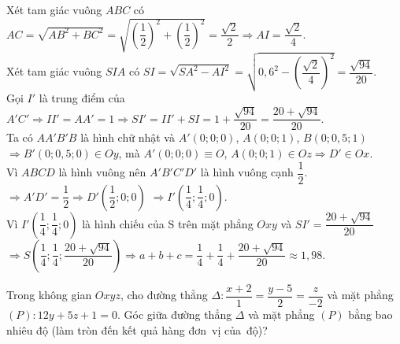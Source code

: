 \begin{bt}
{{		} 
		\noindent 
		Xét tam giác vuông  $ABC$ có $AC=\sqrt{AB^2+BC^2}=\sqrt{\left(\dfrac{1}{2}\right)^2+\left(\dfrac{1}{2}\right)^2}=\dfrac{\sqrt{2}}{2}\Rightarrow AI=\dfrac{\sqrt{2}}{4}$.\\
		Xét tam giác  vuông $SIA$ có $SI=\sqrt{SA^2-AI^2}=\sqrt{0{,}6^2-\left(\dfrac{\sqrt{2}}{4}\right)^2}=\dfrac{\sqrt{94}}{20}$.\\
		Gọi $I'$ là trung điểm của $A'C'\Rightarrow II'=AA'=1\Rightarrow  SI'=II'+SI=1+\dfrac{\sqrt{94}}{20}=\dfrac{20+\sqrt{94}}{20}$.\\
		Ta có $AA'B'B$ là hình chữ nhật  và $A'(0;0;0)$, $A(0;0;1)$, $B(0;0,5;1)$\\
		$\Rightarrow B'(0;0,5;0)\in Oy$, mà $A'(0;0;0)\equiv O$, $A(0;0;1)\in Oz\Rightarrow  D'\in Ox$.\\
		Vì $ABCD$ là hình vuông nên $A'B'C'D'$ là hình vuông  cạnh $\dfrac{1}{2}$.\\
		$\Rightarrow  A'D'=\dfrac{1}{2}\Rightarrow D'\left(\dfrac{1}{2};0;0\right)$
		$ \Rightarrow I'\left(\dfrac{1}{4};\dfrac{1}{4};0\right)  $.\\
		Vì $I'\left(\dfrac{1}{4};\dfrac{1}{4};0\right)$ là hình chiếu của  S trên mặt phẳng $Oxy$ và $SI'=\dfrac{20+\sqrt{94}}{20}$\\
		$\Rightarrow S\left(\dfrac{1}{4};\dfrac{1}{4};\dfrac{20+\sqrt{94}}{20}\right)\Rightarrow a+b+c=\dfrac{1}{4}+\dfrac{1}{4}+\dfrac{20+\sqrt{94}}{20}\approx  1{,}98$.
	} 
\end{bt}

\begin{bt}%
	Trong không gian $Oxyz$, cho đường thẳng $\Delta\colon \dfrac{x+2}{1}=\dfrac{y-5}{2}=\dfrac{z}{-2}$ và mặt phẳng $(P) \colon 12y+5z+1=0$. Góc giữa đường  thẳng $\Delta$ và mặt phẳng $(P)$ bằng bao nhiêu độ (làm tròn đến kết quả hàng đơn~vị của~độ)?
\end{bt}

